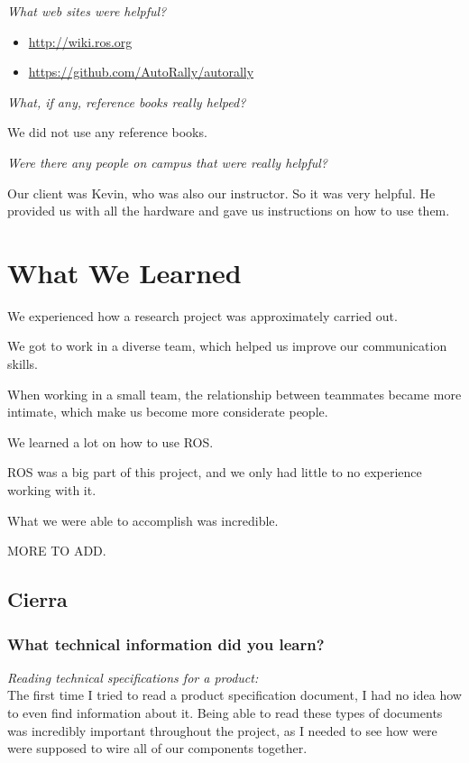\documentclass[compsoc,draftclsnofoot,onecolumn,10pt]{IEEEtran}
\begin{document}
\textit{What web sites were helpful?}
\begin{itemize}
    \item \url{http://wiki.ros.org}
    \item \url{https://github.com/AutoRally/autorally}
\end{itemize}

\textit{What, if any, reference books really helped?}\par
We did not use any reference books.
      
\textit{Were there any people on campus that were really helpful?}\par
Our client was Kevin, who was also our instructor. So it was very helpful.
He provided us with all the hardware and gave us instructions on how to use them.


\section{What We Learned}

We experienced how a research project was approximately carried out.

We got to work in a diverse team, which helped us improve our communication skills.

When working in a small team, the relationship between teammates became more intimate, which make us become more considerate people.

We learned a lot on how to use ROS. 

ROS was a big part of this project, and we only had little to no experience working with it.  

What we were able to accomplish was incredible.

MORE TO ADD.


\subsection{Cierra}
\subsubsection*{What technical information did you learn?}

\textit{Reading technical specifications for a product:\\}
The first time I tried to read a product specification document, I had no idea how to even find information about it. 
Being able to read these types of documents was incredibly important throughout the project, as I needed to see how were were supposed to wire all of our components together. 
\end{document}
